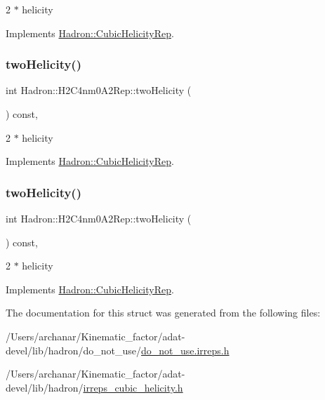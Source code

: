 2 $\ast$ helicity 

Implements \mbox{\hyperlink{structHadron_1_1CubicHelicityRep_af507aa56fc2747eacc8cb6c96db31ecc}{Hadron\+::\+Cubic\+Helicity\+Rep}}.

\mbox{\label{structHadron_1_1H2C4nm0A2Rep_a30b35f728294aa3dc99c1186ca21775e}} 
\subsubsection{\texorpdfstring{twoHelicity()}{twoHelicity()}\hspace{0.1cm}{\footnotesize\ttfamily [2/3]}}
{\footnotesize\ttfamily int Hadron\+::\+H2\+C4nm0\+A2\+Rep\+::two\+Helicity (\begin{DoxyParamCaption}{ }\end{DoxyParamCaption}) const\hspace{0.3cm}{\ttfamily [inline]}, {\ttfamily [virtual]}}

2 $\ast$ helicity 

Implements \mbox{\hyperlink{structHadron_1_1CubicHelicityRep_af507aa56fc2747eacc8cb6c96db31ecc}{Hadron\+::\+Cubic\+Helicity\+Rep}}.

\mbox{\label{structHadron_1_1H2C4nm0A2Rep_a30b35f728294aa3dc99c1186ca21775e}} 
\subsubsection{\texorpdfstring{twoHelicity()}{twoHelicity()}\hspace{0.1cm}{\footnotesize\ttfamily [3/3]}}
{\footnotesize\ttfamily int Hadron\+::\+H2\+C4nm0\+A2\+Rep\+::two\+Helicity (\begin{DoxyParamCaption}{ }\end{DoxyParamCaption}) const\hspace{0.3cm}{\ttfamily [inline]}, {\ttfamily [virtual]}}

2 $\ast$ helicity 

Implements \mbox{\hyperlink{structHadron_1_1CubicHelicityRep_af507aa56fc2747eacc8cb6c96db31ecc}{Hadron\+::\+Cubic\+Helicity\+Rep}}.



The documentation for this struct was generated from the following files\+:\begin{DoxyCompactItemize}
\item 
/\+Users/archanar/\+Kinematic\+\_\+factor/adat-\/devel/lib/hadron/do\+\_\+not\+\_\+use/\mbox{\hyperlink{adat-devel_2lib_2hadron_2do__not__use_2do__not__use_8irreps_8h}{do\+\_\+not\+\_\+use.\+irreps.\+h}}\item 
/\+Users/archanar/\+Kinematic\+\_\+factor/adat-\/devel/lib/hadron/\mbox{\hyperlink{adat-devel_2lib_2hadron_2irreps__cubic__helicity_8h}{irreps\+\_\+cubic\+\_\+helicity.\+h}}\end{DoxyCompactItemize}
